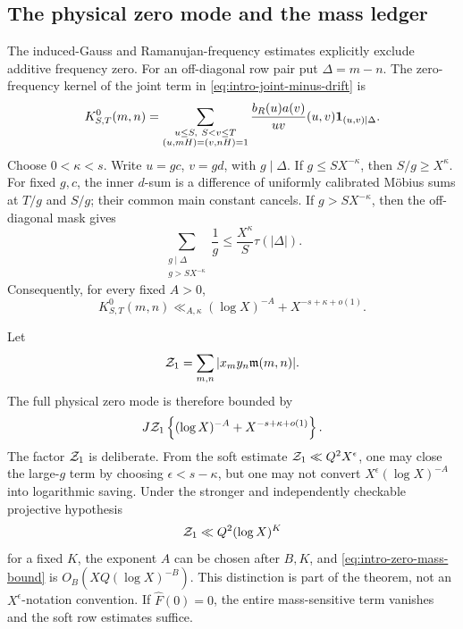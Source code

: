 \subsection{The physical zero mode and the mass ledger}

The induced-Gauss and Ramanujan-frequency estimates explicitly exclude
additive frequency zero.  For an off-diagonal row pair put
\(\Delta=m-n\).  The zero-frequency kernel of the joint term in
\eqref{eq:intro-joint-minus-drift} is
\begin{equation}
 K^0_{S,T}(m,n)=
 \sum_{\substack{u\le S,\ S<v\le T\\
                  (u,mH)=(v,nH)=1}}
 \frac{b_R(u)a(v)}{uv}
 (u,v)\mathbf 1_{(u,v)\mid\Delta}.
 \label{eq:intro-zero-kernel}
\end{equation}
Choose \(0<\kappa<s\).  Write \(u=gc\), \(v=gd\), with
\(g\mid\Delta\).  If \(g\le SX^{-\kappa}\), then
\(S/g\ge X^\kappa\).  For fixed \(g,c\), the inner \(d\)-sum is a
difference of uniformly calibrated M\"obius sums at \(T/g\) and
\(S/g\); their common main constant cancels.  If
\(g>SX^{-\kappa}\), then the off-diagonal mask gives
\begin{equation}
 \sum_{\substack{g\mid\Delta\\g>SX^{-\kappa}}}\frac1g
 \le \frac{X^\kappa}{S}\tau(|\Delta|).
 \label{eq:intro-large-g}
\end{equation}
Consequently, for every fixed \(A>0\),
\begin{equation}
 \boxed{
 K^0_{S,T}(m,n)
 \ll_{A,\kappa}
 (\log X)^{-A}+X^{-s+\kappa+o(1)}.}
 \label{eq:intro-zero-bound}
\end{equation}

Let
\begin{equation}
 \mathcal Z_1=\sum_{m,n}|x_my_n\mathfrak m(m,n)|.
 \label{eq:intro-Z1}
\end{equation}
The full physical zero mode is therefore bounded by
\begin{equation}
 J\mathcal Z_1\left\{(\log X)^{-A}
              +X^{-s+\kappa+o(1)}\right\}.
 \label{eq:intro-zero-mass-bound}
\end{equation}
The factor \(\mathcal Z_1\) is deliberate.  From the soft estimate
\(\mathcal Z_1\ll Q^2X^\epsilon\), one may close the large-\(g\) term by
choosing \(\epsilon<s-\kappa\), but one may not convert
\(X^\epsilon(\log X)^{-A}\) into logarithmic saving.  Under the
stronger and independently checkable projective hypothesis
\begin{equation}
 \mathcal Z_1\ll Q^2(\log X)^K
 \label{eq:intro-polylog-mass}
\end{equation}
for a fixed \(K\), the exponent \(A\) can be chosen after \(B,K\), and
\eqref{eq:intro-zero-mass-bound} is
\(O_B(XQ(\log X)^{-B})\).  This distinction is part of the theorem,
not an \(X^\epsilon\)-notation convention.  If
\(\widehat F(0)=0\), the entire mass-sensitive term vanishes and the
soft row estimates suffice.


